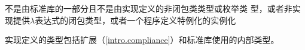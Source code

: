 不是由\cpp{}标准库的一部分且不是由实现定义的非闭包类类型或枚举类
型，或者非实现提供$\lambda$表达式的闭包类型，或者一个程序定义特例化的实例化

\begin{note}
  实现定义的类型包括扩展（\ref{intro.compliance}）和标准库使用的内部类型。
\end{note}
